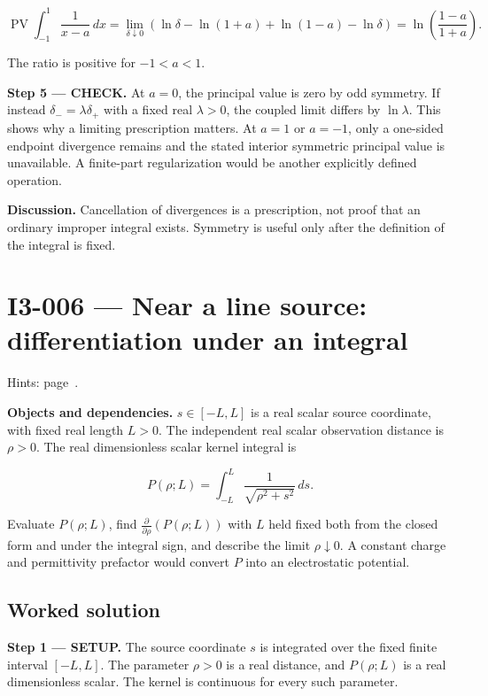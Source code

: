 \documentclass[11pt,oneside,openany]{book}
\begin{document}
\[
\operatorname{PV}\int_{-1}^{1}\frac{1}{x-a}\,dx
=\lim_{\delta\downarrow0}\left(\ln\delta-\ln(1+a)+\ln(1-a)-\ln\delta\right)
=\ln\left(\frac{1-a}{1+a}\right).
\]

The ratio is positive for \(-1<a<1\).

\endgroup
\textbf{Step 5 --- CHECK.} At \(a=0\), the principal value is zero by odd symmetry. If instead \(\delta_-=\lambda\delta_+\) with a fixed real \(\lambda>0\), the coupled limit differs by \(\ln\lambda\). This shows why a limiting prescription matters. At \(a=1\) or \(a=-1\), only a one-sided endpoint divergence remains and the stated interior symmetric principal value is unavailable. A finite-part regularization would be another explicitly defined operation.

\textbf{Discussion.} Cancellation of divergences is a prescription, not proof that an ordinary improper integral exists. Symmetry is useful only after the definition of the integral is fixed.
\clearpage
\section{I3-006 --- Near a line source: differentiation under an integral}
\label{problem:I3-006}
{\small Hints: page~\pageref{hints:I3-006}.}\par\medskip

\textbf{Objects and dependencies.} \(s\in[-L,L]\) is a real scalar source coordinate, with fixed real length \(L>0\). The independent real scalar observation distance is \(\rho>0\). The real dimensionless scalar kernel integral is

\[
P(\rho;L)=\int_{-L}^L\frac{1}{\sqrt{\rho^2+s^2}}\,ds.
\]

Evaluate \(P(\rho;L)\), find \(\frac{\partial}{\partial\rho}\left(P(\rho;L)\right)\) with \(L\) held fixed both from the closed form and under the integral sign, and describe the limit \(\rho\downarrow0\). A constant charge and permittivity prefactor would convert \(P\) into an electrostatic potential.
\subsection*{Worked solution}

\textbf{Step 1 --- SETUP.} The source coordinate \(s\) is integrated over the fixed finite interval \([-L,L]\). The parameter \(\rho>0\) is a real distance, and \(P(\rho;L)\) is a real dimensionless scalar. The kernel is continuous for every such parameter.
\end{document}

